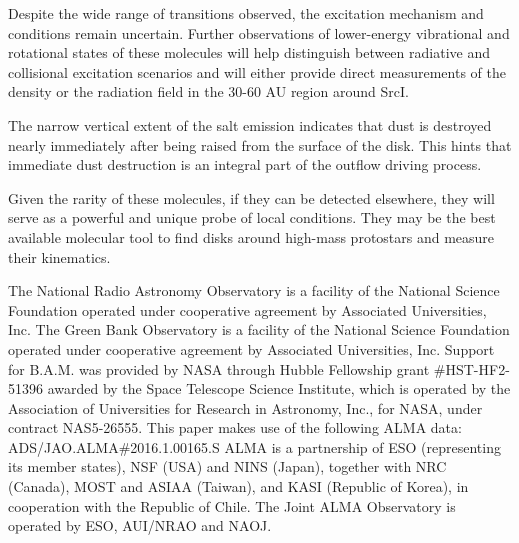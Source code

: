 \documentclass[twocolumn]{aastex62}
\newcommand{\sourcei}{SrcI\xspace}
\begin{document}
Despite the wide range of transitions observed, the excitation mechanism and
conditions remain uncertain.  Further observations of lower-energy vibrational
and rotational states of these molecules will help distinguish between
radiative and collisional excitation scenarios and will either provide
direct measurements of the density or the radiation field in the 30-60 AU
region around \sourcei.

The narrow vertical extent of the salt emission indicates that dust is
destroyed nearly immediately after being raised from the surface of the disk.
This hints that immediate dust destruction is an integral part of the outflow
driving process.

Given the rarity of these molecules, if they can be detected elsewhere,
they will serve as a powerful and unique probe of local conditions.
They may be the best available molecular tool to find disks around high-mass
protostars and measure their kinematics.  



\acknowledgements
The National Radio Astronomy Observatory is a facility of the National Science
Foundation operated under cooperative agreement by Associated Universities,
Inc. The Green Bank Observatory is a facility of the National Science
Foundation operated under cooperative agreement by Associated Universities,
Inc. Support for B.A.M. was provided by NASA through Hubble Fellowship grant
\#HST-HF2-51396 awarded by the Space Telescope Science Institute, which is
operated by the Association of Universities for Research in Astronomy, Inc.,
for NASA, under contract NAS5-26555. 
This paper makes use of the following ALMA data: ADS/JAO.ALMA\#2016.1.00165.S
ALMA is a partnership of ESO (representing its member states), NSF (USA) and
NINS (Japan), together with NRC (Canada), MOST and ASIAA (Taiwan), and KASI
(Republic of Korea), in cooperation with the Republic of Chile. The Joint ALMA
Observatory is operated by ESO, AUI/NRAO and NAOJ.




\end{document}
